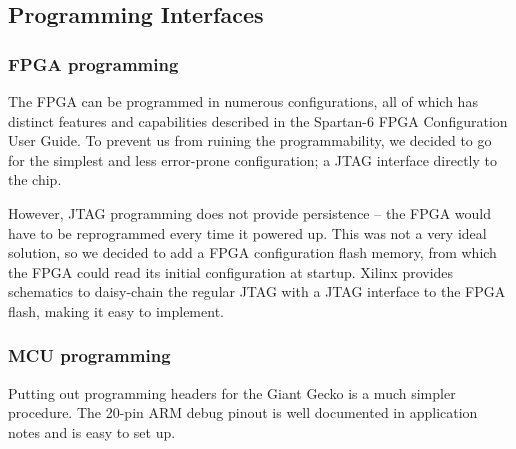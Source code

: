 \subsection{Programming Interfaces}

\subsubsection{FPGA programming}
The FPGA can be programmed in numerous configurations, all of which has distinct
features and capabilities described in the Spartan-6 FPGA Configuration User
Guide. To prevent us from ruining the programmability, we decided to go for the
simplest and less error-prone configuration; a JTAG interface directly to the
chip.

However, JTAG programming does not provide persistence -- the FPGA would
have to be reprogrammed every time it powered up. This was not a very ideal
solution, so we decided to add a FPGA configuration flash memory, from which
the FPGA could read its initial configuration at startup. Xilinx provides
schematics to daisy-chain  the regular JTAG with a
JTAG interface to the FPGA flash, making it easy to implement.

\subsubsection{MCU programming}
Putting out programming headers for the Giant Gecko is a much simpler procedure.
The 20-pin ARM debug pinout is well documented in application notes and is easy
to set up.
